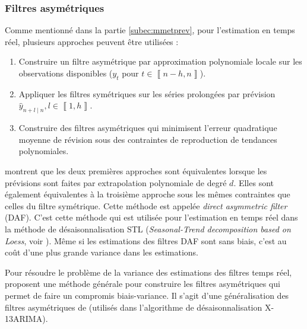 \documentclass[
  12pt,
  a4paper,french]{article}
\newcommand\1{\mathds{1}}
\begin{document}
\hypertarget{subsec-lppasymf}{%
\subsubsection{Filtres asymétriques}\label{subsec-lppasymf}}

Comme mentionné dans la partie \ref{subec:mmetprev}, pour l'estimation en temps réel, plusieurs approches peuvent être utilisées :

\begin{enumerate}
\def\labelenumi{\arabic{enumi}.}
\item
  Construire un filtre asymétrique par approximation polynomiale locale sur les observations disponibles (\(y_{t}\) pour \(t\in\left\llbracket n-h,n\right\rrbracket\)).
\item
  Appliquer les filtres symétriques sur les séries prolongées par prévision \(\hat{y}_{n+l\mid n},l\in\left\llbracket 1,h\right\rrbracket\).
\item
  Construire des filtres asymétriques qui minimisent l'erreur quadratique moyenne de révision sous des contraintes de reproduction de tendances polynomiales.
\end{enumerate}

\textcite{proietti2008} montrent que les deux premières approches sont équivalentes lorsque les prévisions sont faites par extrapolation polynomiale de degré \(d\).
Elles sont également équivalentes à la troisième approche sous les mêmes contraintes que celles du filtre symétrique.
Cette méthode est appelée \emph{direct asymmetric filter} (DAF).
C'est cette méthode qui est utilisée pour l'estimation en temps réel dans la méthode de désaisonnalisation STL (\emph{Seasonal-Trend decomposition based on Loess}, voir \textcite{cleveland90}).
Même si les estimations des filtres DAF sont sans biais, c'est au coût d'une plus grande variance dans les estimations.

Pour résoudre le problème de la variance des estimations des filtres temps réel, \textcite{proietti2008} proposent une méthode générale pour construire les filtres asymétriques qui permet de faire un compromis biais-variance.
Il s'agit d'une généralisation des filtres asymétriques de \textcite{musgrave1964set} (utilisés dans l'algorithme de désaisonnalisation X-13ARIMA).
\end{document}
